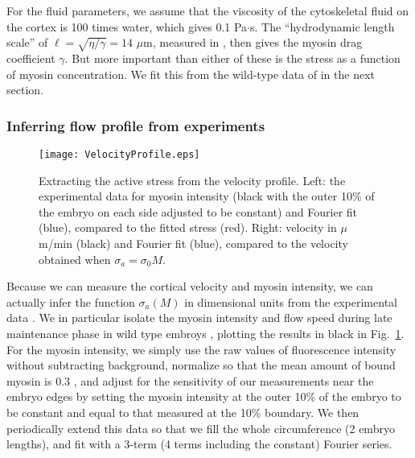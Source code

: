 \documentclass[11pt]{article}
\newcommand{\6}[1]{#1_{\text{6}}}
\newcommand{\3}[1]{#1_{\text{3}}}
\begin{document}
For the fluid parameters, we assume that the viscosity of the cytoskeletal fluid on the cortex is 100 times water, which gives 0.1 Pa$\cdot$s. The ``hydrodynamic length scale'' of $\ell=\sqrt{\eta/\gamma}=14$ $\mu$m, measured in \cite{mayer2010anisotropies, saha2016determining}, then gives the myosin drag coefficient $\gamma$. But more important than either of these is the stress as a function of myosin concentration. We fit this from the wild-type data of \cite{sailer2015dynamic} in the next section.

\subsubsection{Inferring flow profile from experiments \label{sec:MyVelFit}}

\begin{figure}
\centering
\texttt{[image: VelocityProfile.eps]}
\caption{\label{fig:VelProf} Extracting the active stress from the velocity profile. Left: the experimental data for myosin intensity (black with the outer 10\% of the embryo on each side adjusted to be constant) and Fourier fit (blue), compared to the fitted stress (red). Right: velocity in $\mu$m/min (black) and Fourier fit (blue), compared to the velocity obtained when $\sigma_a=\sigma_0 M$. }
\end{figure}


Because we can measure the cortical velocity and myosin intensity, we can actually infer the function $\sigma_a(M)$ in dimensional units from the experimental data \cite{sailer2015dynamic}. We in particular isolate the myosin intensity and flow speed during late maintenance phase in wild type embroys \cite[Fig.~1B(bottom)]{sailer2015dynamic}, plotting the results in black in Fig.\ \ref{fig:VelProf}. For the myosin intensity, we simply use the raw values of fluorescence intensity without subtracting background, normalize so that the mean amount of bound myosin is 0.3 \cite[Fig.~S3]{gross2019guiding}, and adjust for the sensitivity of our measurements near the embryo edges by setting the myosin intensity at the outer 10\% of the embryo to be constant and equal to that measured at the 10\% boundary. We then periodically extend this data so that we fill the whole circumference (2 embryo lengths), and fit with a 3-term (4 terms including the constant) Fourier series. 
\end{document}
